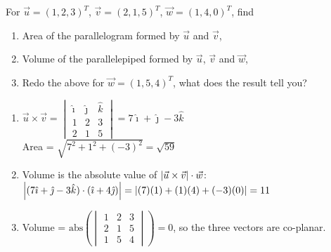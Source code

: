 \begin{Exercise}
For $\vec{u} = (1,2,3)^T$, $\vec{v} = (2,1,5)^T$, $\vec{w} = (1,4,0)^T$, find
\begin{enumerate}[label=(\alph*)]
\item Area of the parallelogram formed by $\vec{u}$ and $\vec{v}$,
\item Volume of the parallelepiped formed by $\vec{u}$, $\vec{v}$ and $\vec{w}$,
\item Redo the above for $\vec{w} = (1,5,4)^T$, what does the result tell you?
\end{enumerate}
\end{Exercise}
\begin{Answer}
\begin{enumerate}[label=(\alph*)]
\item $\vec{u} \times \vec{v} =
\begin{vmatrix}
\hat{\imath} & \hat{\jmath} & \hat{k}\\
1 & 2 & 3\\
2 & 1 & 5    
\end{vmatrix}
=
7\hat{\imath} + \hat{\jmath} - 3\hat{k}$\\
Area = $\sqrt{7^2 + 1^2 + (-3)^2} = \sqrt{59}$
\item Volume is the absolute value of $\abs{\vec{u} \times \vec{v}} \cdot \vec{w}$: $\abs{(7\hat{\imath} + \hat{\jmath} - 3\hat{k}) \cdot (\hat{\imath} + 4\hat{\jmath})} = \abs{(7)(1) + (1)(4) + (-3)(0)} = 11$
\item Volume = $\text{abs}\left(
\begin{vmatrix}
1 & 2 & 3\\
2 & 1 & 5\\
1 & 5 & 4
\end{vmatrix}\right)
= 0$, so the three vectors are co-planar.
\end{enumerate}
\end{Answer}


